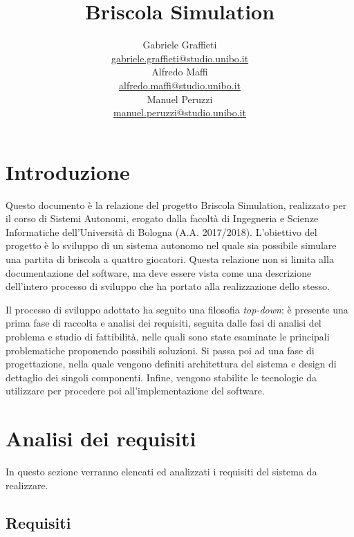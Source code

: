 \documentclass[a4paper,12pt]{article}
\title{\Huge \textbf{Briscola Simulation} \\
	\vspace{10pt}
	\vspace{20pt}
}
\author{
	Gabriele Graffieti \\ \small \url{gabriele.graffieti@studio.unibo.it}
	\vspace{15pt}
	\\
	Alfredo Maffi \\ \small \url{alfredo.maffi@studio.unibo.it}
	\vspace{15pt}
	\\
	Manuel Peruzzi \\ \small \url{manuel.peruzzi@studio.unibo.it}
}
\date{}
\begin{document}
\maketitle
{}
\newpage
\tableofcontents
\newpage
\section{Introduzione}

Questo documento è la relazione del progetto Briscola Simulation, realizzato per il corso di Sistemi Autonomi, erogato dalla facoltà di Ingegneria e Scienze Informatiche dell'Università di Bologna (A.A. 2017/2018). L'obiettivo del progetto è lo sviluppo di un sistema autonomo nel quale sia possibile simulare una partita di briscola a quattro giocatori. Questa relazione non si limita alla documentazione del software, ma deve essere vista come una descrizione dell'intero processo di sviluppo che ha portato alla realizzazione dello stesso.

Il processo di sviluppo adottato ha seguito una filosofia \emph{top-down}: è presente una prima fase di raccolta e analisi dei requisiti, seguita dalle fasi di analisi del problema e studio di fattibilità, nelle quali sono state esaminate le principali problematiche proponendo possibili soluzioni. Si passa poi ad una fase di progettazione, nella quale vengono definiti architettura del sistema e design di dettaglio dei singoli componenti. Infine, vengono stabilite le tecnologie da utilizzare per procedere poi all'implementazione del software.

\section{Analisi dei requisiti} \label{requirements-analysis}

In questo sezione verranno elencati ed analizzati i requisiti del sistema da realizzare. 

\subsection{Requisiti}
\end{document}
